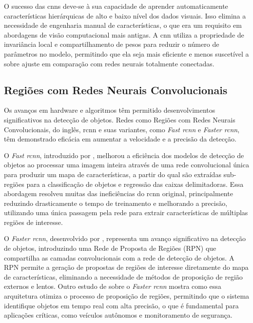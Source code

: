 O sucesso das \gls{cnn}s deve-se à sua capacidade de aprender automaticamente características hierárquicas de alto e baixo nível dos dados visuais. Isso elimina a necessidade de engenharia manual de características, o que era um requisito em abordagens de visão computacional mais antigas. A \gls{cnn} utiliza a propriedade de invariância local e compartilhamento de pesos para reduzir o número de parâmetros no modelo, permitindo que ela seja mais eficiente e menos suscetível a sobre ajuste em comparação com redes neurais totalmente conectadas.

 \subsection{Regiões com Redes Neurais Convolucionais}\label{subsec:rcnns}

 Os avanços em hardware e algoritmos têm permitido desenvolvimentos significativos na detecção de objetos. Redes como Regiões com Redes Neurais Convolucionais, do inglês, \gls{rcnn} e suas variantes, como \textit{Fast \gls{rcnn}} e \textit{Faster \gls{rcnn}}, têm demonstrado eficácia em aumentar a velocidade e a precisão da detecção. 

  O \textit{Fast \gls{rcnn}}, introduzido por , melhorou a eficiência dos modelos de detecção de objetos ao processar uma imagem inteira através de uma rede convolucional única para produzir um mapa de características, a partir do qual são extraídas sub-regiões para a classificação de objetos e regressão das caixas delimitadoras. Essa abordagem resolveu muitas das ineficiências do \gls{rcnn} original, principalmente reduzindo drasticamente o tempo de treinamento e melhorando a precisão, utilizando uma única passagem pela rede para extrair características de múltiplas regiões de interesse.

  O \textit{Faster \gls{rcnn}}, desenvolvido por , representa um avanço significativo na detecção de objetos, introduzindo uma Rede de Proposta de Regiões (RPN) que compartilha as camadas convolucionais com a rede de detecção de objetos. A RPN permite a geração de propostas de regiões de interesse diretamente do mapa de características, eliminando a necessidade de métodos de proposição de região externos e lentos. Outro estudo de  sobre o \textit{Faster \gls{rcnn}} mostra como essa arquitetura otimiza o processo de proposição de regiões, permitindo que o sistema identifique objetos em tempo real com alta precisão, o que é fundamental para aplicações críticas, como veículos autônomos e monitoramento de segurança.


